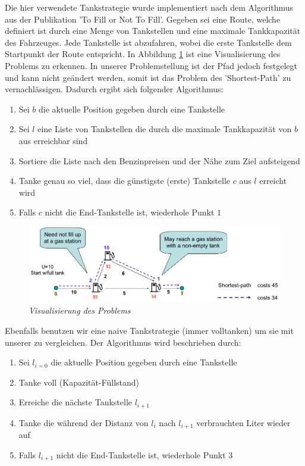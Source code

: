 \documentclass[
ngerman          %
,a4paper          %
,11pt
,pdftex
]{report}
\begin{document}
Die hier verwendete Tankstrategie wurde implementiert nach dem Algorithmus aus der Publikation 'To Fill or Not To Fill'\cite{fixedgas}.
Gegeben sei eine Route, welche definiert ist durch eine Menge von Tankstellen und eine maximale Tankkapazität des Fahrzeuges.
Jede Tankstelle ist abzufahren, wobei die erste Tankstelle dem Startpunkt der Route entspricht. In Abbildung \ref{fig:fixedgas} ist eine Visualisierung des Problems zu erkennen. In unserer Problemstellung ist der Pfad jedoch festgelegt und kann nicht geändert werden, somit ist das Problem des 'Shortest-Path' zu vernachlässigen. 
Dadurch ergibt sich folgender Algorithmus:
\begin{enumerate}
\item Sei $b$ die aktuelle Position gegeben durch eine Tankstelle
\item Sei $l$ eine Liste von Tankstellen die durch die maximale Tankkapazität von $b$ aus erreichbar sind
\item Sortiere die Liste nach den Benzinpreisen und der Nähe zum Ziel aufsteigend
\item Tanke genau so viel, dass die günstigste (erste) Tankstelle $c$ aus $l$ erreicht wird
\item Falls $c$ nicht die End-Tankstelle ist, wiederhole Punkt $1$
\end{enumerate}

\begin{figure}
	\centering
	\includegraphics[width=0.8\linewidth]{images/fixedgas}
	\caption[Beispiel Ablauf]{\textit{Visualisierung des Problems \cite{fixedgasimage}}} 
	\label{fig:fixedgas}
\end{figure}



Ebenfalls benutzen wir eine naive Tankstrategie (immer volltanken) um sie mit unserer zu vergleichen. Der Algorithmus wird beschrieben durch:

\begin{enumerate}
\item Sei $l_{i=0}$ die aktuelle Position gegeben durch eine Tankstelle
\item Tanke voll (Kapazität-Füllstand)
\item Erreiche die nächste Tankstelle $l_{i+1}$
\item Tanke die während der Distanz von $l_{i}$ nach $l_{i+1}$ verbrauchten Liter wieder auf
\item Falls $l_{i+1}$ nicht die End-Tankstelle ist, wiederhole Punkt $3$
\end{enumerate}
\end{document}
